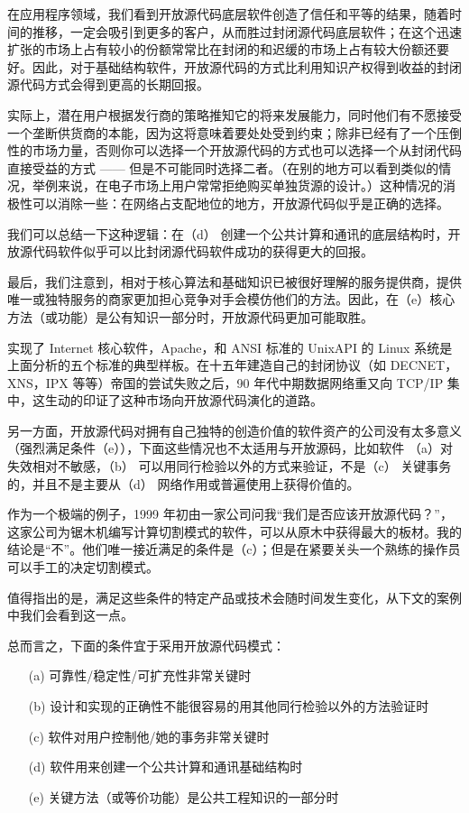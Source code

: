 在应用程序领域，我们看到开放源代码底层软件创造了信任和平等的结果，随着时间的推移，一定会吸引到更多的客户，从而胜过封闭源代码底层软件；在这个迅速扩张的市场上占有较小的份额常常比在封闭的和迟缓的市场上占有较大份额还要好。因此，对于基础结构软件，开放源代码的方式比利用知识产权得到收益的封闭源代码方式会得到更高的长期回报。


实际上，潜在用户根据发行商的策略推知它的将来发展能力，同时他们有不愿接受一个垄断供货商的本能，因为这将意味着要处处受到约束；除非已经有了一个压倒性的市场力量，否则你可以选择一个开放源代码的方式也可以选择一个从封闭代码直接受益的方式 —— 但是不可能同时选择二者。（在别的地方可以看到类似的情况，举例来说，在电子市场上用户常常拒绝购买单独货源的设计。）这种情况的消极性可以消除一些：在网络占支配地位的地方，开放源代码似乎是正确的选择。


我们可以总结一下这种逻辑：在（d） 创建一个公共计算和通讯的底层结构时，开放源代码软件似乎可以比封闭源代码软件成功的获得更大的回报。


最后，我们注意到，相对于核心算法和基础知识已被很好理解的服务提供商，提供唯一或独特服务的商家更加担心竞争对手会模仿他们的方法。因此，在（e）核心方法（或功能）是公有知识一部分时，开放源代码更加可能取胜。


实现了 Internet 核心软件，Apache，和 ANSI 标准的 UnixAPI 的 Linux 系统是上面分析的五个标准的典型样板。在十五年建造自己的封闭协议（如 DECNET，XNS，IPX 等等）帝国的尝试失败之后，90 年代中期数据网络重又向 TCP/IP 集中，这生动的印证了这种市场向开放源代码演化的道路。


另一方面，开放源代码对拥有自己独特的创造价值的软件资产的公司没有太多意义（强烈满足条件（e）），下面这些情况也不太适用与开放源码，比如软件 （a）对失效相对不敏感，（b） 可以用同行检验以外的方式来验证，不是（c） 关键事务的，并且不是主要从（d） 网络作用或普遍使用上获得价值的。


作为一个极端的例子，1999 年初由一家公司问我“我们是否应该开放源代码？”，这家公司为锯木机编写计算切割模式的软件，可以从原木中获得最大的板材。我的结论是“不”。他们唯一接近满足的条件是（c）；但是在紧要关头一个熟练的操作员可以手工的决定切割模式。


值得指出的是，满足这些条件的特定产品或技术会随时间发生变化，从下文的案例中我们会看到这一点。


总而言之，下面的条件宜于采用开放源代码模式：

\begin{enumerate}
\item[(a)] 可靠性/稳定性/可扩充性非常关键时
\item[(b)] 设计和实现的正确性不能很容易的用其他同行检验以外的方法验证时
\item[(c)] 软件对用户控制他/她的事务非常关键时
\item[(d)] 软件用来创建一个公共计算和通讯基础结构时
\item[(e)] 关键方法（或等价功能）是公共工程知识的一部分时
\end{enumerate}

